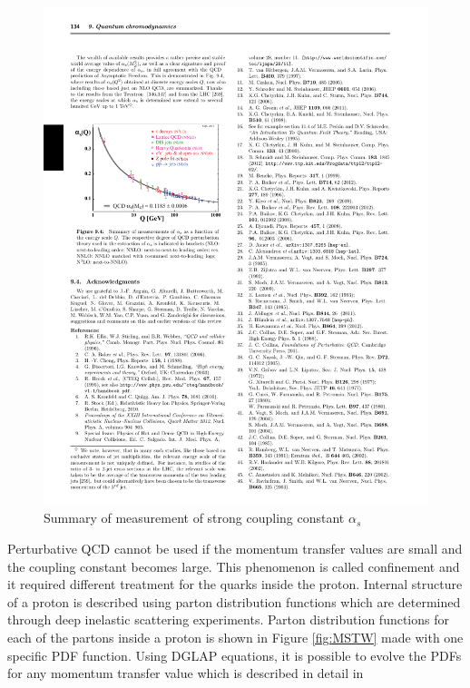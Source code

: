 \begin{figure}[htbp]
	\centering
		\includegraphics{Figures/alpha_s.pdf}
	\caption[Strong force coupling constant]{Summary of measurement of strong coupling constant $\alpha_s$\cite{Agashe:2014kda} }
	\label{fig:alpha_s}
\end{figure}

	\par Perturbative QCD cannot be used if the momentum transfer values are small and the coupling constant becomes large. This phenomenon is called confinement and it required different treatment for the quarks inside the proton. Internal structure of a proton is described using parton distribution functions which are determined through deep inelastic scattering experiments. Parton distribution functions for each of the partons inside a proton is shown in Figure \ref{fig:MSTW} made with one specific PDF function. Using DGLAP equations, it is possible to evolve the PDFs for any momentum transfer value which is described in detail in \cite{Campbell:2006wx} 

